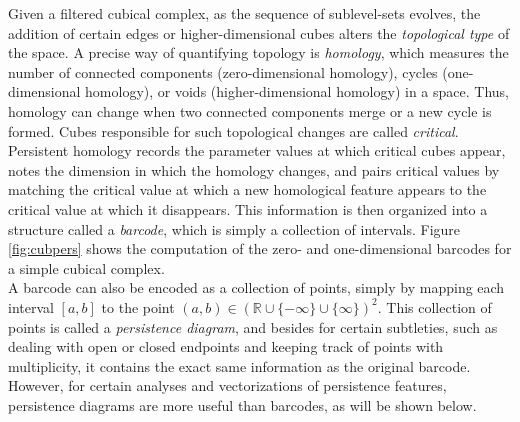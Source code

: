 \documentclass[conference]{IEEEtran}
\theoremstyle{definition}
\numberwithin{figure}{section}
\begin{document}
Given a filtered cubical complex, as the sequence of sublevel-sets evolves, the addition of certain edges or higher-dimensional cubes alters the \emph{topological type} of the space. A precise way of quantifying topology is \emph{homology}, which measures the number of connected components (zero-dimensional homology), cycles (one-dimensional homology), or voids (higher-dimensional homology) in a space. Thus, homology can change when two connected components merge or a new cycle is formed. Cubes responsible for such topological changes are called \emph{critical}. Persistent homology records the parameter values at which critical cubes appear, notes the dimension in which the homology changes, and pairs critical values by matching the critical value at which a new homological feature appears to the critical value at which it disappears. This information is then organized into a structure called a \emph{barcode}, which is simply a collection of intervals. Figure \ref{fig:cubpers} shows the computation of the zero- and one-dimensional barcodes for a simple cubical complex.\\

A barcode can also be encoded as a collection of points, simply by mapping each interval $[a,b]$ to the point $(a,b) \in (\mathbb{R}\cup \{-\infty\} \cup \{\infty\})^2$. This collection of points is called a \emph{persistence diagram}, and besides for certain subtleties, such as dealing with open or closed endpoints and  keeping track of points with multiplicity, it contains the exact same information as the original barcode. However, for certain analyses and vectorizations of persistence features, persistence diagrams are more useful than barcodes, as will be shown below.\\
\end{document}
